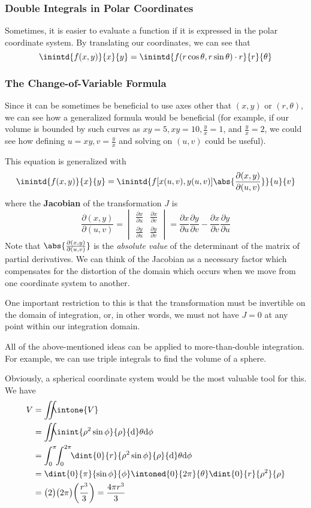 \documentclass[12pt]{article}
\begin{document}
\subsubsection*{Double Integrals in Polar Coordinates}
Sometimes, it is easier to evaluate a function if it is expressed in the polar coordinate system. By translating our coordinates, we can see that \[ \inintd{f(x,y)}{x}{y} = \inintd{f(r\cos\theta, r\sin\theta)\cdot r}{r}{\theta} \]

\subsubsection*{The Change-of-Variable Formula}
Since it can be sometimes be beneficial to use axes other that $(x,y)$ or $(r,\theta)$, we can see how a generalized formula would be beneficial (for example, if our volume is bounded by such curves as $xy = 5, xy = 10, \frac{y}{x} = 1$, and $\frac{y}{x} = 2$, we could see how defining $u = xy, v = \frac{y}{x}$ and solving on $(u,v)$ could be useful).

This equation is generalized with \[ \inintd{f(x,y)}{x}{y} = \inintd{f[x(u,v),y(u,v)] \abs{\frac{\partial (x,y)}{\partial (u,v)}}}{u}{v} \] where the {\bf Jacobian} of the transformation $J$ is \[ \frac{\partial (x,y)}{\partial (u,v)} = \begin{vmatrix}\frac{\partial x}{\partial u} & \frac{\partial x}{\partial v} \\ \frac{\partial y}{\partial u} & \frac{\partial y}{\partial v}\end{vmatrix} = \frac{\partial x}{\partial u}\frac{\partial y}{\partial v} - \frac{\partial x}{\partial v}\frac{\partial y}{\partial u} \] Note that $\abs{\frac{\partial (x,y)}{\partial (u,v)}}$ is the \emph{absolute value} of the determinant of the matrix of partial derivatives. We can think of the Jacobian as a necessary factor which compensates for the distortion of the domain which occurs when we move from one coordinate system to another.

One important restriction to this is that the transformation must be invertible on the domain of integration, or, in other words, we must not have $J = 0$ at any point within our integration domain.

All of the above-mentioned ideas can be applied to more-than-double integration. For example, we can use triple integrals to find the volume of a sphere.

Obviously, a spherical coordinate system would be the most valuable tool for this. We have
\begin{align*}
V &= \int\!\!\!\!\int\!\!\!\!\intone{V}\\
  &= \int\!\!\!\!\int\!\!\!\!\inint{\rho^2 \sin\phi}{\rho}{\rm d}\theta{\rm d}\phi\\
  &= \int_0^\pi\!\! \int_0^{2\pi}\!\! \dint{0}{r}{\rho^2 \sin\phi}{\rho}{\rm d}\theta{\rm d}\phi\\
  &= \dint{0}{\pi}{\sin\phi}{\phi} \intoned{0}{2\pi}{\theta} \dint{0}{r}{\rho^2}{\rho}\\
  &= \bigl(2\bigl) \bigl(2\pi\bigl) \bigg(\frac{r^3}{3}\bigg) = \frac{4\pi r^3}{3}
\end{align*}
\end{document}
